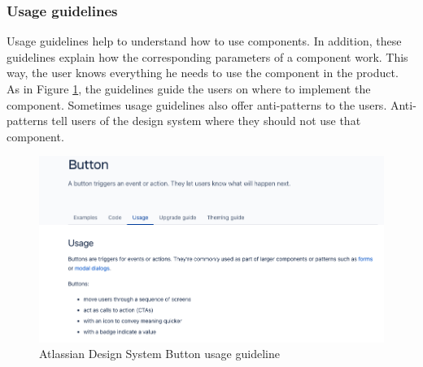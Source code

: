 \subsubsection{Usage guidelines} Usage guidelines help to understand how to use components. In addition, these guidelines explain how the corresponding parameters of a component work. This way, the user knows everything he needs to use the component in the product. \cite{vesselov_building_2019} \\
As in Figure \ref{atlassian_button}, the guidelines guide the users on where to implement the component. Sometimes usage guidelines also offer anti-patterns to the users. Anti-patterns tell users of the design system where they should not use that component.
\begin{figure}[htb]
\centerline{\includegraphics[width=\linewidth]{images/atlassian_button_usage.png}}
\caption{Atlassian Design System Button usage guideline \cite{atlassian_design_system_atlassian_nodate}}
\label{atlassian_button}
\end{figure}

